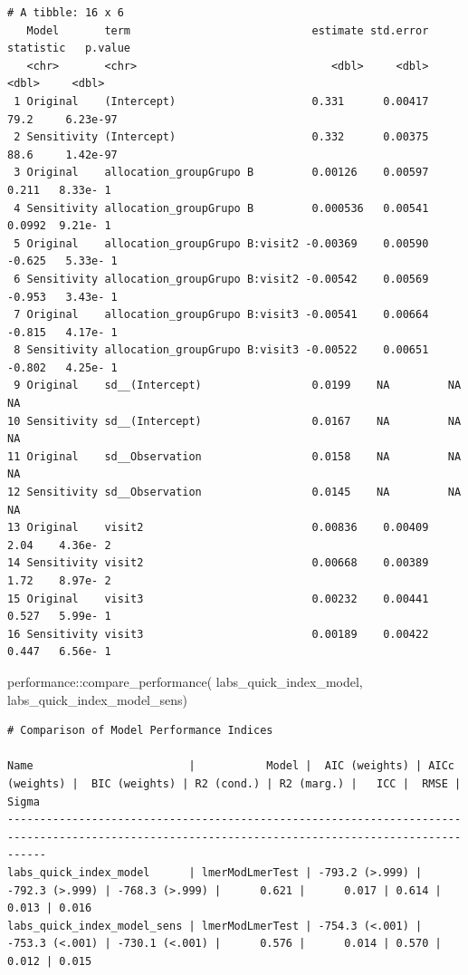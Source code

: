 \documentclass[
  12pt,
]{article}
\newenvironment{Shaded}{\begin{snugshade}}{\end{snugshade}}
\newcommand{\FunctionTok}[1]{\textcolor[rgb]{0.28,0.35,0.67}{#1}}
\newcommand{\NormalTok}[1]{\textcolor[rgb]{0.00,0.23,0.31}{#1}}
\newcommand{\SpecialCharTok}[1]{\textcolor[rgb]{0.37,0.37,0.37}{#1}}
\begin{document}
\begin{verbatim}
# A tibble: 16 x 6
   Model       term                            estimate std.error statistic   p.value
   <chr>       <chr>                              <dbl>     <dbl>     <dbl>     <dbl>
 1 Original    (Intercept)                     0.331      0.00417   79.2     6.23e-97
 2 Sensitivity (Intercept)                     0.332      0.00375   88.6     1.42e-97
 3 Original    allocation_groupGrupo B         0.00126    0.00597    0.211   8.33e- 1
 4 Sensitivity allocation_groupGrupo B         0.000536   0.00541    0.0992  9.21e- 1
 5 Original    allocation_groupGrupo B:visit2 -0.00369    0.00590   -0.625   5.33e- 1
 6 Sensitivity allocation_groupGrupo B:visit2 -0.00542    0.00569   -0.953   3.43e- 1
 7 Original    allocation_groupGrupo B:visit3 -0.00541    0.00664   -0.815   4.17e- 1
 8 Sensitivity allocation_groupGrupo B:visit3 -0.00522    0.00651   -0.802   4.25e- 1
 9 Original    sd__(Intercept)                 0.0199    NA         NA      NA       
10 Sensitivity sd__(Intercept)                 0.0167    NA         NA      NA       
11 Original    sd__Observation                 0.0158    NA         NA      NA       
12 Sensitivity sd__Observation                 0.0145    NA         NA      NA       
13 Original    visit2                          0.00836    0.00409    2.04    4.36e- 2
14 Sensitivity visit2                          0.00668    0.00389    1.72    8.97e- 2
15 Original    visit3                          0.00232    0.00441    0.527   5.99e- 1
16 Sensitivity visit3                          0.00189    0.00422    0.447   6.56e- 1
\end{verbatim}

\begin{Shaded}
\begin{Highlighting}[]
\NormalTok{performance}\SpecialCharTok{::}\FunctionTok{compare\_performance}\NormalTok{(}
\NormalTok{    labs\_quick\_index\_model, }
\NormalTok{    labs\_quick\_index\_model\_sens) }
\end{Highlighting}
\end{Shaded}

\begin{verbatim}
# Comparison of Model Performance Indices

Name                        |           Model |  AIC (weights) | AICc (weights) |  BIC (weights) | R2 (cond.) | R2 (marg.) |   ICC |  RMSE | Sigma
--------------------------------------------------------------------------------------------------------------------------------------------------
labs_quick_index_model      | lmerModLmerTest | -793.2 (>.999) | -792.3 (>.999) | -768.3 (>.999) |      0.621 |      0.017 | 0.614 | 0.013 | 0.016
labs_quick_index_model_sens | lmerModLmerTest | -754.3 (<.001) | -753.3 (<.001) | -730.1 (<.001) |      0.576 |      0.014 | 0.570 | 0.012 | 0.015
\end{verbatim}
\end{document}
